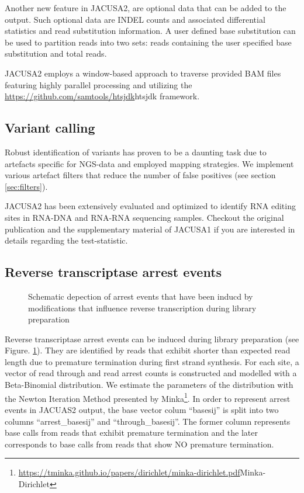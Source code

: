 \documentclass[10pt,a4paper]{article}
\begin{document}
Another new feature in JACUSA2, are optional data that can be added to the output.
Such optional data are INDEL counts and associated differential statistics and read substitution information.
A user defined base substitution can be used to partition reads into two sets: reads containing the 
user specified base substitution and total reads.

JACUSA2 employs a window-based approach to traverse provided BAM\cite{HengLi2009} files featuring highly 
parallel processing and utilizing the \url{https://github.com/samtools/htsjdk}{htsjdk} framework.
\subsection{Variant calling}
Robust identification of variants has proven to be a daunting task due to artefacts specific for 
NGS-data and employed mapping strategies. We implement various artefact filters that reduce the number 
of false positives (see section \ref{sec:filters}).

JACUSA2 has been extensively evaluated and optimized to identify RNA editing sites in RNA-DNA and
RNA-RNA sequencing samples. Checkout the original publication and the supplementary material of 
JACUSA1 \cite{Piechotta2017} if you are interested in details regarding the test-statistic.
\subsection{Reverse transcriptase arrest events}
\begin{figure}[ht]
  \centering
  \caption{Schematic depection of arrest events that have been inducd by modifications that influence 
  reverse transcription during library preparation}
  \label{fig:arrest_events}
\end{figure}
Reverse transcriptase arrest events can be induced during library preparation (see Figure. \ref{fig:arrest_events}). 
They are identified by reads that exhibit shorter than expected read length due to premature termination 
during first strand synthesis. For each site, a vector of read through and read arrest counts is constructed 
and modelled with a Beta-Binomial distribution. We estimate the parameters of the distribution with 
the Newton Iteration Method presented by Minka\footnote{\url{https://tminka.github.io/papers/dirichlet/minka-dirichlet.pdf}{Minka-Dirichlet}}.
In order to represent arrest events in JACUAS2 output, the base vector colum ``basesij''  is split into 
two columns ``arrest\_basesij'' and ``through\_basesij''. The former column represents base calls from 
reads that exhibit premature termination and the later corresponds to base calls from reads that 
show NO premature termination.
\end{document}

